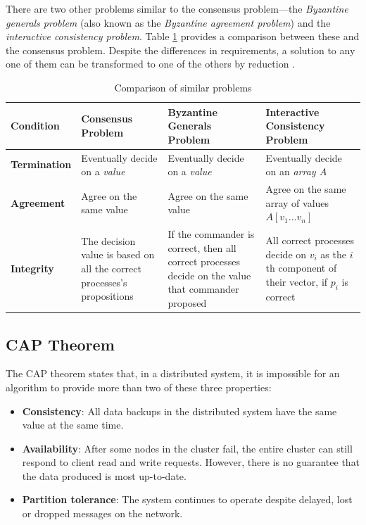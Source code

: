 \documentclass[12pt, a4paper]{article}
\begin{document}
There are two other problems similar to the consensus problem---the
\textit{Byzantine generals problem} (also known as the \textit{Byzantine
agreement problem}) and the \textit{interactive consistency problem}. Table
\ref{tab:dbtap} provides a comparison between these and the consensus problem.
Despite the differences in requirements, a solution to any one of them can be
transformed to one of the others by reduction \cite{fischer1983consensus}.

\begin{table}[htp]
  \centering
  \begin{tabularx}{\linewidth}{lXXX}
  \toprule
  Condition & Consensus Problem & Byzantine Generals Problem
    & Interactive Consistency Problem \\
  \midrule
  \textbf{Termination} & Eventually decide on a \textit{value}
    & Eventually decide on a \textit{value}
    & Eventually decide on an \textit{array $A$} \\
  \addlinespace
  \textbf{Agreement} & Agree on the same value
    & Agree on the same value
    & Agree on the same array of values $A[v_{1} \ldots v_{n}]$ \\
  \addlinespace
  \textbf{Integrity}
    & The decision value is based on all the correct processes's propositions
    & If the commander is correct, then all correct processes decide
      on the value that commander proposed
    & All correct processes decide on $v_{i}$ as the ${i}$th component of their
      vector, if $p_{i}$ is correct \\
  \bottomrule
\end{tabularx}
  \caption{Comparison of similar problems}
  \label{tab:dbtap}
\end{table}

\subsection{CAP Theorem}

The CAP theorem \cite{brewer2012cap} states that, in a distributed system, it is
impossible for an algorithm to provide more than two of these three properties:

\begin{itemize}
	\item \textbf{Consistency}: All data backups in the distributed system have
    the same value at the same time.
	\item \textbf{Availability}: After some nodes in the cluster fail, the entire
    cluster can still respond to client read and write requests. However, there
    is no guarantee that the data produced is most up-to-date.
	\item \textbf{Partition tolerance}: The system continues to operate despite
    delayed, lost or dropped messages on the network.
\end{itemize}
\end{document}
